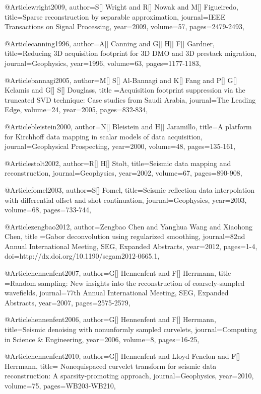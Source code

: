 {@Article{wright2009,
  author={S[] Wright and R[] Nowak and M[] Figueiredo},
  title={Sparse reconstruction by separable approximation},
  journal={IEEE Transactions on Signal Processing},
  year=2009,
  volume=57,
  pages={2479-2493},
}

@Article{canning1996,
  author={A[] Canning and G[] H[] F[] Gardner},
  title={Reducing 3{D} acquisition footprint for 3{D} DMO and 3{D} prestack migration},
  journal={Geophysics},
  year=1996,
  volume=63,
  pages={1177-1183},
}

@Article{bannagi2005,
  author={M[] S[] Al-Bannagi and K[] Fang and P[] G[] Kelamis and G[] S[] Douglass},
  title ={Acquisition footprint suppression via the truncated SVD technique: Case studies from Saudi Arabia},
  journal={The Leading Edge},
  volume=24,
  year=2005,
  pages={832-834},
}

@Article{bleistein2000,
  author={N[] Bleistein and H[] Jaramillo},
  title={A platform for Kirchhoff data mapping in scalar models of data acquisition},
  journal={Geophysical Prospecting},
  year=2000,
  volume=48,
  pages={135-161},
}

@Article{stolt2002,
  author={R[] H[] Stolt},
  title={Seismic data mapping and reconstruction},
  journal={Geophysics},
  year=2002,
  volume=67,
  pages={890-908},
}


@Article{fomel2003,
  author={S[] Fomel},
  title={Seismic reflection data interpolation with differential offset and shot continuation},
  journal={Geophysics},
  year=2003,
  volume=68,
  pages={733-744},
}

@Article{zengbao2012,
  author={Zengbao Chen and Yanghua Wang and Xiaohong Chen},
  title ={Gabor deconvolution using regularized smoothing},
  journal={82nd Annual International Meeting, SEG, Expanded Abstracts},
  year=2012,
  pages={1-4},
  doi={http://dx.doi.org/10.1190/segam2012-0665.1},
}

@Article{hennenfent2007,
  author={G[] Hennenfent and F[] Herrmann},
  title ={Random sampling: New insights into the reconstruction of coarsely-sampled wavefields},
  journal={77th Annual International Meeting, SEG, Expanded Abstracts},
  year=2007,
  pages={2575-2579},
}

@Article{hennenfent2006,
  author={G[] Hennenfent and F[] Herrmann},
  title={Seismic denoising with nonunformly sampled curvelets},
  journal={Computing in Science \& Engineering},
  year=2006,
  volume=8,
  pages={16-25},
}

@Article{hennenfent2010,
  author={G[] Hennenfent and Lloyd Fenelon and F[] Herrmann},
  title={	
Nonequispaced curvelet transform for seismic data reconstruction: A sparsity-promoting approach},
  journal={Geophysics},
  year=2010,
  volume=75,
  pages={WB203-WB210},
}

}
